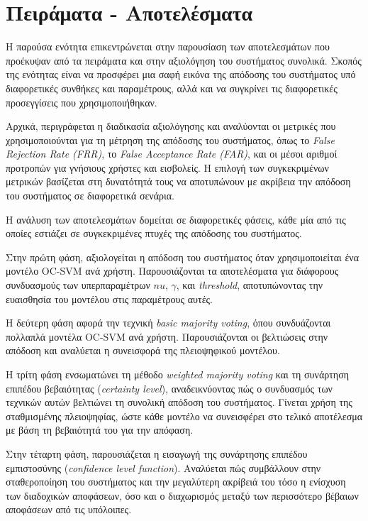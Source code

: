 \chapter{Πειράματα - Αποτελέσματα}
\label{chapter:experiments}

Η παρούσα ενότητα επικεντρώνεται στην παρουσίαση των αποτελεσμάτων που προέκυψαν από τα πειράματα και στην αξιολόγηση του συστήματος συνολικά. Σκοπός της ενότητας είναι να προσφέρει μια σαφή εικόνα της απόδοσης του συστήματος υπό διαφορετικές συνθήκες και παραμέτρους, αλλά και να συγκρίνει τις διαφορετικές προσεγγίσεις που χρησιμοποιήθηκαν.

Αρχικά, περιγράφεται η διαδικασία αξιολόγησης και αναλύονται οι μετρικές που χρησιμοποιούνται για τη μέτρηση της απόδοσης του συστήματος, όπως το \textit{False Rejection Rate (FRR)}, το \textit{False Acceptance Rate (FAR)}, και οι μέσοι αριθμοί προτροπών για γνήσιους χρήστες και εισβολείς. Η επιλογή των συγκεκριμένων μετρικών βασίζεται στη δυνατότητά τους να αποτυπώνουν με ακρίβεια την απόδοση του συστήματος σε διαφορετικά σενάρια.

Η ανάλυση των αποτελεσμάτων δομείται σε διαφορετικές φάσεις, κάθε μία από τις οποίες εστιάζει σε συγκεκριμένες πτυχές της απόδοσης του συστήματος.

Στην πρώτη φάση, αξιολογείται η απόδοση του συστήματος όταν χρησιμοποιείται ένα μοντέλο OC-SVM ανά χρήστη. Παρουσιάζονται τα αποτελέσματα για διάφορους συνδυασμούς των υπερπαραμέτρων $nu$, $\gamma$, και \textit{threshold}, αποτυπώνοντας την ευαισθησία του μοντέλου στις παραμέτρους αυτές.

Η δεύτερη φάση αφορά την τεχνική \textit{basic majority voting}, όπου συνδυάζονται πολλαπλά μοντέλα OC-SVM ανά χρήστη. Παρουσιάζονται οι βελτιώσεις στην απόδοση και αναλύεται η συνεισφορά της πλειοψηφικού μοντέλου.

Η τρίτη φάση ενσωματώνει τη μέθοδο \textit{weighted majority voting} και τη συνάρτηση επιπέδου βεβαιότητας (\textit{certainty level}), αναδεικνύοντας πώς ο συνδυασμός των τεχνικών αυτών βελτιώνει τη συνολική απόδοση του συστήματος. Γίνεται χρήση της σταθμισμένης πλειοψηφίας, ώστε κάθε μοντέλο να συνεισφέρει στο τελικό αποτέλεσμα με βάση τη βεβαιότητά του για την απόφαση.

Στην τέταρτη φάση, παρουσιάζεται η εισαγωγή της συνάρτησης επιπέδου εμπιστοσύνης (\textit{confidence level function}). Αναλύεται πώς συμβάλλουν στην σταθεροποίηση του συστήματος και την μεγαλύτερη ακρίβειά του τόσο η ενίσχυση των διαδοχικών αποφάσεων, όσο και ο διαχωρισμός μεταξύ των περισσότερο βέβαιων αποφάσεων από τις υπόλοιπες.

